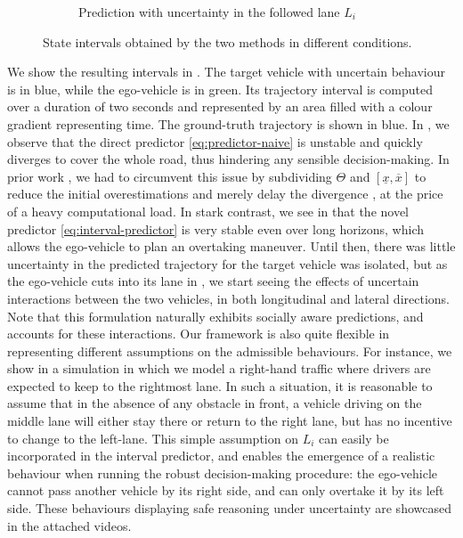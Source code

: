 \begin{figure}
\begin{center}
\begin{subfigure}[b]{0.75\linewidth}
		\caption{Prediction with uncertainty in the followed lane $L_i$}
		\label{sub:hw-d}
	\end{subfigure}
	\end{center}
	\caption{State intervals obtained by the two methods in different conditions.}
	\label{fig:highway}
\end{figure}


We show the resulting intervals in . The target vehicle with uncertain behaviour is in blue, while the ego-vehicle is in green. Its trajectory interval is computed over a duration of two seconds and represented by an area filled with a colour gradient representing time. The ground-truth trajectory is shown in blue. In , we observe that the direct predictor \eqref{eq:predictor-naive} is unstable and quickly diverges to cover the whole road, thus hindering any sensible decision-making. In prior work \citep{Leurent2018approximate}, we had to circumvent this issue by subdividing $\Theta$ and $[\underline{x}, \overline{x}]$ to reduce the initial overestimations and merely delay the divergence \citep{Adrot2003}, at the price of a heavy computational load. In stark contrast, we see in  that the novel predictor \eqref{eq:interval-predictor} is very stable even over long horizons, which allows the ego-vehicle to plan an overtaking maneuver. Until then, there was little uncertainty in the predicted trajectory for the target vehicle was isolated, but as the ego-vehicle cuts into its lane in , we start seeing the effects of uncertain interactions between the two vehicles, in both longitudinal and lateral directions. Note that this formulation naturally exhibits socially aware predictions, and accounts for these interactions. Our framework is also quite flexible in representing different assumptions on the admissible behaviours. For instance, we show in  a simulation in which we model a right-hand traffic where drivers are expected to keep to the rightmost lane. In such a situation, it is reasonable to assume that in the absence of any obstacle in front, a vehicle driving on the middle lane will either stay there or return to the right lane, but has no incentive to change to the left-lane. This simple assumption on $L_i$ can easily be incorporated in the interval predictor, and enables the emergence of a realistic behaviour when running the robust decision-making procedure: the ego-vehicle cannot pass another vehicle by its right side, and can only overtake it by its left side. These behaviours displaying safe reasoning under uncertainty are showcased in the attached videos.

